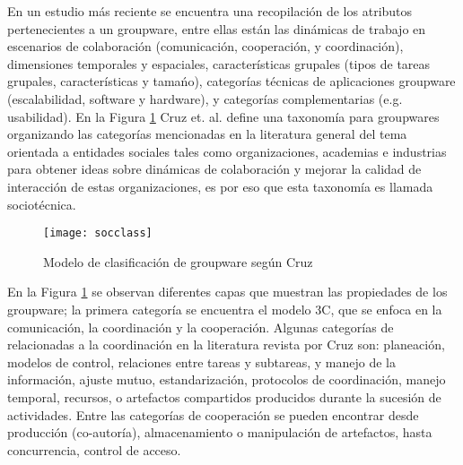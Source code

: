 
En un estudio m\'as reciente \citep{cruz2012towards} se encuentra una recopilaci\'on de los atributos pertenecientes a un groupware, entre ellas est\'an las din\'amicas de trabajo en escenarios de colaboraci\'on (comunicaci\'on, cooperaci\'on, y coordinaci\'on), dimensiones temporales y espaciales, caracter\'isticas grupales (tipos de tareas grupales, caracter\'isticas y tama\'no), categor\'ias t\'ecnicas de aplicaciones groupware (escalabilidad, software y hardware), y categor\'ias complementarias (e.g. usabilidad). En la Figura \ref{gw:stmodel} Cruz et. al. \citep{cruz2012towards} define una taxonom\'ia para groupwares organizando las categor\'ias mencionadas en la literatura general del tema orientada a entidades sociales tales como organizaciones, academias e industrias para obtener ideas sobre din\'amicas de colaboraci\'on y mejorar la calidad de interacci\'on de estas organizaciones, es por eso que esta taxonom\'ia es llamada sociot\'ecnica.

\begin{figure}[h!]
  \centering
  \texttt{[image: socclass]}
  \caption{Modelo de clasificaci\'on de groupware seg\'un Cruz \citep{cruz2012towards}}
  \label{gw:stmodel}
\end{figure}

En la Figura \ref{gw:stmodel} se observan diferentes capas que muestran las propiedades de los groupware; la primera categor\'ia se encuentra el modelo 3C, que se enfoca en la comunicaci\'on, la coordinaci\'on y la cooperaci\'on. Algunas categor\'ias de relacionadas a la coordinaci\'on en la literatura revista por Cruz \citep{cruz2012towards} son: planeaci\'on, modelos de control, relaciones entre tareas y subtareas, y manejo de la informaci\'on, ajuste mutuo, estandarizaci\'on, protocolos de coordinaci\'on, manejo temporal, recursos, o artefactos compartidos producidos durante la sucesi\'on de actividades. Entre las categor\'ias de cooperaci\'on se pueden encontrar desde producci\'on (co-autor\'ia), almacenamiento o manipulaci\'on de artefactos, hasta concurrencia, control de acceso.

